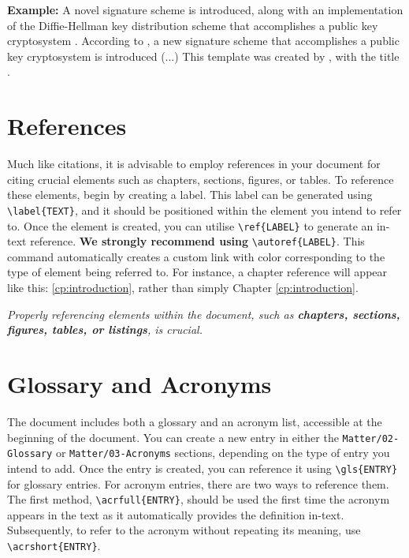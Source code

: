 {	\noindent\textbf{Example:} A novel signature scheme is introduced, along with an implementation of the Diffie-Hellman key distribution scheme that accomplishes a public key cryptosystem \citep{Elgamal1985}. According to \citet{Elgamal1985}, a new signature scheme that accomplishes a public key cryptosystem is introduced (...) This template was created by \citeauthor{IPLeiriaThesis}, with the title .

	\section{References}
	Much like citations, it is advisable to employ references in your document for citing crucial elements such as chapters, sections, figures, or tables. To reference these elements, begin by creating a label. This label can be generated using \verb|\label{TEXT}|, and it should be positioned within the element you intend to refer to. Once the element is created, you can utilise \verb|\ref{LABEL}| to generate an in-text reference. \textbf{We strongly recommend using} \verb|\autoref{LABEL}|. This command automatically creates a custom link with color corresponding to the type of element being referred to. For instance, a chapter reference will appear like this: \autoref{cp:introduction}, rather than simply Chapter \ref{cp:introduction}.

	\begin{block}[tip]
		\textit{Properly referencing elements within the document, such as \textbf{chapters, sections, figures, tables, or listings}, is crucial.}
	\end{block}

	\section{Glossary and Acronyms}
	The document includes both a glossary and an acronym list, accessible at the beginning of the document. You can create a new entry in either the \verb|Matter/02-Glossary| or \verb|Matter/03-Acronyms| sections, depending on the type of entry you intend to add. Once the entry is created, you can reference it using \verb|\gls{ENTRY}| for glossary entries. For acronym entries, there are two ways to reference them. The first method, \verb|\acrfull{ENTRY}|, should be used the first time the acronym appears in the text as it automatically provides the definition in-text. Subsequently, to refer to the acronym without repeating its meaning, use \verb|\acrshort{ENTRY}|.

}
